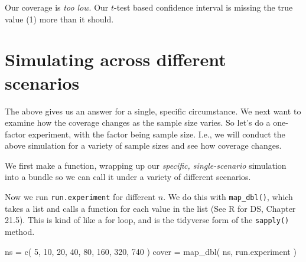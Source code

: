 \documentclass[
]{book}
\newenvironment{Shaded}{\begin{snugshade}}{\end{snugshade}}
\newcommand{\ControlFlowTok}[1]{\textcolor[rgb]{0.13,0.29,0.53}{\textbf{#1}}}
\newcommand{\DecValTok}[1]{\textcolor[rgb]{0.00,0.00,0.81}{#1}}
\newcommand{\FunctionTok}[1]{\textcolor[rgb]{0.00,0.00,0.00}{#1}}
\newcommand{\NormalTok}[1]{#1}
\newcommand{\OtherTok}[1]{\textcolor[rgb]{0.56,0.35,0.01}{#1}}
\newcommand{\SpecialCharTok}[1]{\textcolor[rgb]{0.00,0.00,0.00}{#1}}
\begin{document}
Our coverage is \emph{too low}. Our \(t\)-test based confidence interval is missing
the true value (1) more than it should.

\hypertarget{simulating-across-different-scenarios}{%
\section{Simulating across different scenarios}\label{simulating-across-different-scenarios}}

The above gives us an answer for a single, specific circumstance. We next
want to examine how the coverage changes as the sample size varies. So let's
do a one-factor experiment, with the factor being sample size. I.e., we will
conduct the above simulation for a variety of sample sizes and see how
coverage changes.

We first make a function, wrapping up our \emph{specific, single-scenario}
simulation into a bundle so we can call it under a variety of different
scenarios.

\begin{Shaded}
\end{Shaded}

Now we run \texttt{run.experiment} for different \(n\). We do this with \texttt{map\_dbl()},
which takes a list and calls a function for each value in the list (See R for
DS, Chapter 21.5).
This is kind of like a for loop, and is the tidyverse form of the \texttt{sapply()} method.

\begin{Shaded}
\begin{Highlighting}[]
\NormalTok{ns }\OtherTok{=} \FunctionTok{c}\NormalTok{( }\DecValTok{5}\NormalTok{, }\DecValTok{10}\NormalTok{, }\DecValTok{20}\NormalTok{, }\DecValTok{40}\NormalTok{, }\DecValTok{80}\NormalTok{, }\DecValTok{160}\NormalTok{, }\DecValTok{320}\NormalTok{, }\DecValTok{740}\NormalTok{ )}
\NormalTok{cover }\OtherTok{=} \FunctionTok{map\_dbl}\NormalTok{( ns, run.experiment )}
\end{Highlighting}
\end{Shaded}
\end{document}
